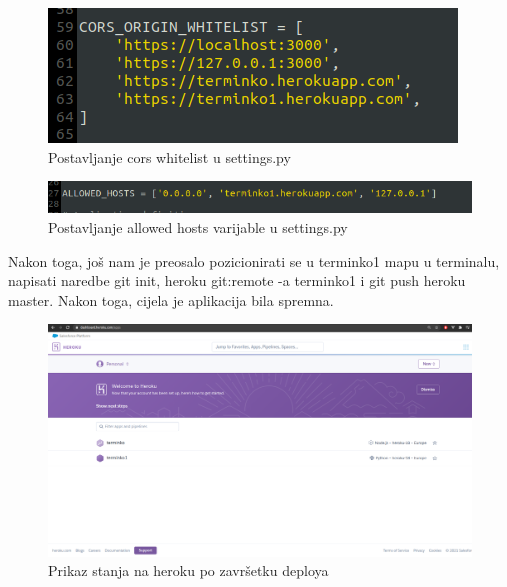 			\begin{figure}[H]
				\centering
				\includegraphics[scale=0.80]{slike/CorsWhitelist.PNG}
				\caption{Postavljanje cors whitelist u settings.py}
				\label{fig:promjene}
			\end{figure}
		
			\begin{figure}[H]
				\centering
				\includegraphics[scale=0.60]{slike/AllowedHosts.PNG}
				\caption{Postavljanje allowed hosts varijable u settings.py}
				\label{fig:promjene}
			\end{figure}
		
			Nakon toga, još nam je preosalo pozicionirati se u terminko1 mapu u terminalu, napisati naredbe git init, heroku git:remote -a terminko1 i git push heroku master. Nakon toga, cijela je aplikacija bila spremna. 
			
			\begin{figure}[H]
				\centering
				\includegraphics[scale=0.20]{slike/HerokuAplikacije.PNG}
				\caption{Prikaz stanja na heroku po završetku deploya}
				\label{fig:promjene}
			\end{figure}